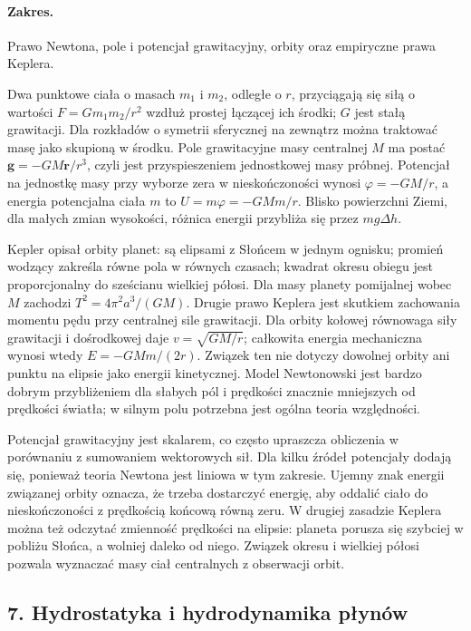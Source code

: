 \documentclass[11pt,a4paper]{article}
\begin{document}
\paragraph{Zakres.} Prawo Newtona, pole i potencjał grawitacyjny, orbity oraz empiryczne prawa Keplera.

Dwa punktowe ciała o masach $m_1$ i $m_2$, odległe o $r$, przyciągają się siłą o wartości $F=Gm_1m_2/r^2$ wzdłuż prostej łączącej ich środki; $G$ jest stałą grawitacji. Dla rozkładów o symetrii sferycznej na zewnątrz można traktować masę jako skupioną w środku. Pole grawitacyjne masy centralnej $M$ ma postać $\mathbf g=-GM\mathbf r/r^3$, czyli jest przyspieszeniem jednostkowej masy próbnej. Potencjał na jednostkę masy przy wyborze zera w nieskończoności wynosi $\varphi=-GM/r$, a energia potencjalna ciała $m$ to $U=m\varphi=-GMm/r$. Blisko powierzchni Ziemi, dla małych zmian wysokości, różnica energii przybliża się przez $mg\Delta h$.

Kepler opisał orbity planet: są elipsami z Słońcem w jednym ognisku; promień wodzący zakreśla równe pola w równych czasach; kwadrat okresu obiegu jest proporcjonalny do sześcianu wielkiej półosi. Dla masy planety pomijalnej wobec $M$ zachodzi $T^2=4\pi^2a^3/(GM)$. Drugie prawo Keplera jest skutkiem zachowania momentu pędu przy centralnej sile grawitacji. Dla orbity kołowej równowaga siły grawitacji i dośrodkowej daje $v=\sqrt{GM/r}$; całkowita energia mechaniczna wynosi wtedy $E=-GMm/(2r)$. Związek ten nie dotyczy dowolnej orbity ani punktu na elipsie jako energii kinetycznej. Model Newtonowski jest bardzo dobrym przybliżeniem dla słabych pól i prędkości znacznie mniejszych od prędkości światła; w silnym polu potrzebna jest ogólna teoria względności.

Potencjał grawitacyjny jest skalarem, co często upraszcza obliczenia w porównaniu z sumowaniem wektorowych sił. Dla kilku źródeł potencjały dodają się, ponieważ teoria Newtona jest liniowa w tym zakresie. Ujemny znak energii związanej orbity oznacza, że trzeba dostarczyć energię, aby oddalić ciało do nieskończoności z prędkością końcową równą zeru. W drugiej zasadzie Keplera można też odczytać zmienność prędkości na elipsie: planeta porusza się szybciej w pobliżu Słońca, a wolniej daleko od niego. Związek okresu i wielkiej półosi pozwala wyznaczać masy ciał centralnych z obserwacji orbit.

\subsection{7. Hydrostatyka i hydrodynamika płynów}
\end{document}
